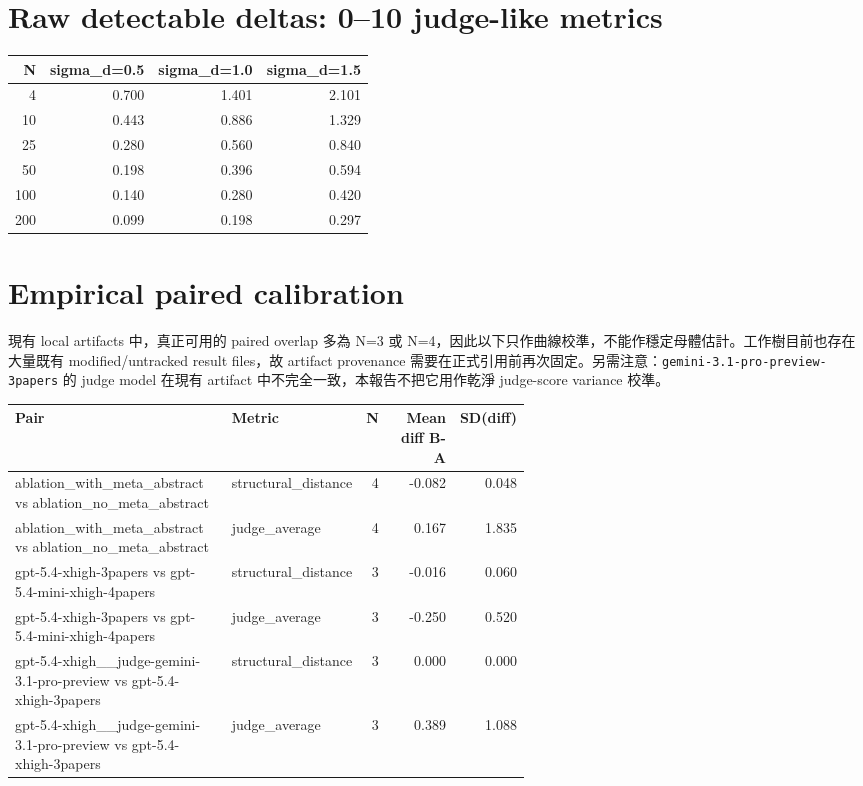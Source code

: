 \documentclass[11pt]{article}
\begin{document}
\section*{Raw detectable deltas: 0--10 judge-like metrics}
\begin{tabular}{rrrr}
\toprule
N & sigma\_d=0.5 & sigma\_d=1.0 & sigma\_d=1.5 \\
\midrule
4 & 0.700 & 1.401 & 2.101 \\
10 & 0.443 & 0.886 & 1.329 \\
25 & 0.280 & 0.560 & 0.840 \\
50 & 0.198 & 0.396 & 0.594 \\
100 & 0.140 & 0.280 & 0.420 \\
200 & 0.099 & 0.198 & 0.297 \\
\bottomrule
\end{tabular}

\section*{Empirical paired calibration}
現有 local artifacts 中，真正可用的 paired overlap 多為 N=3 或 N=4，因此以下只作曲線校準，不能作穩定母體估計。工作樹目前也存在大量既有 modified/untracked result files，故 artifact provenance 需要在正式引用前再次固定。另需注意：\texttt{gemini-3.1-pro-preview-3papers} 的 judge model 在現有 artifact 中不完全一致，本報告不把它用作乾淨 judge-score variance 校準。

\begin{tabular}{p{0.42\linewidth}p{0.18\linewidth}rrr}
\toprule
Pair & Metric & N & Mean diff B-A & SD(diff) \\
\midrule
ablation\_with\_meta\_abstract vs ablation\_no\_meta\_abstract & structural\_distance & 4 & -0.082 & 0.048 \\
ablation\_with\_meta\_abstract vs ablation\_no\_meta\_abstract & judge\_average & 4 & 0.167 & 1.835 \\
gpt-5.4-xhigh-3papers vs gpt-5.4-mini-xhigh-4papers & structural\_distance & 3 & -0.016 & 0.060 \\
gpt-5.4-xhigh-3papers vs gpt-5.4-mini-xhigh-4papers & judge\_average & 3 & -0.250 & 0.520 \\
gpt-5.4-xhigh\_\_judge-gemini-3.1-pro-preview vs gpt-5.4-xhigh-3papers & structural\_distance & 3 & 0.000 & 0.000 \\
gpt-5.4-xhigh\_\_judge-gemini-3.1-pro-preview vs gpt-5.4-xhigh-3papers & judge\_average & 3 & 0.389 & 1.088 \\
\bottomrule
\end{tabular}
\end{document}

